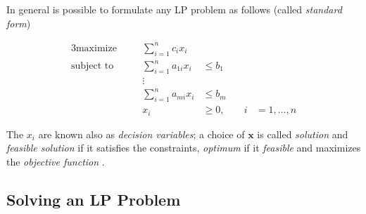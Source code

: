 %
In general is possible to formulate any \acrshort{LP} problem as follows (called \emph{standard form}) \cite{Vanderbei2008}

\begin{alignat}{3}
	\label{eq:standard-form}
	\text{maximize}   &       & \sum_{i=1}^{n} c_{i}x_{i}                                          \\
	\text{subject to} & \quad & \sum_{i=1}^{n} a_{1i}  x_{i} & \leq b_{1} &                        \\
	                  &       & \vdots                                                             \\
	                  &       & \sum_{i=1}^{n} a_{mi}  x_{i} & \leq b_{m} &                        \\
	                  &       & x_{i}                        & \geq 0,    & \quad i & =1 ,\dots, n
\end{alignat}


The $x_i$ are known also as \emph{decision variables}; a choice of $ \mathbf{x}
$ is called \emph{solution} and \emph{feasible solution} if it satisfies the
constraints, \emph{optimum} if it \emph{feasible} and maximizes the \emph{objective function}
\cite{Vanderbei2008}.

\subsection{Solving an LP Problem}%
\label{sub:solving_an_lp_problem}

